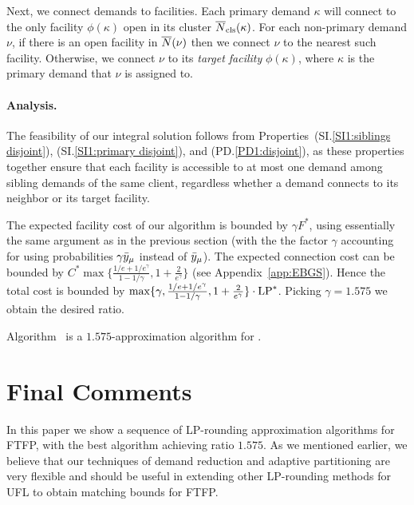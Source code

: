 \documentclass{llncs}
\begin{document}
Next, we connect demands to facilities.  Each primary demand $\kappa$
will connect to the only facility $\phi(\kappa)$ open in its cluster
${\overline{N}}_{\text{cls}}(\kappa)$.  For each non-primary demand $\nu$, if there is
an open facility in ${\overline{N}}(\nu)$ then we connect $\nu$ to the nearest
such facility. Otherwise, we connect $\nu$ to its \emph{target
  facility} $\phi(\kappa)$, where $\kappa$ is the primary demand that
$\nu$ is assigned to.


\paragraph{Analysis.}
The feasibility of our integral solution follows from
Properties~(SI.\ref{SI1:siblings disjoint}), (SI.\ref{SI1:primary
  disjoint}), and (PD.\ref{PD1:disjoint}), as these properties together
ensure that each facility is accessible to at most one demand among
sibling demands of the same client, regardless whether a demand
connects to its neighbor or its target facility.

The expected facility cost of our algorithm is bounded by $\gamma
F^\ast$, using essentially the same argument as in the previous
section (with the the factor $\gamma$ accounting for using
probabilities $\gamma {\bar y}_{\mu}$ instead of ${\bar y}_{\mu}$). The
expected connection cost can be bounded by $C^\ast
\max\{\frac{1/e+1/e^\gamma}{1-1/\gamma}, 1+\frac{2}{e^\gamma}\}$ (see
Appendix~\ref{app:EBGS}).  Hence the total cost is bounded by
$\max\{\gamma, \frac{1/e+1/e^\gamma}{1-1/\gamma},
1+\frac{2}{e^\gamma}\}\cdot \mbox{\rm LP}^\ast$. Picking $\gamma=1.575$ we
obtain the desired ratio.

\begin{theorem}\label{thm:ebgs}
  Algorithm~{\EBGS} is a $1.575$-approximation algorithm for \FTFP.
\end{theorem}



\section{Final Comments}

In this paper we show a sequence of LP-rounding approximation algorithms
for FTFP, with the best algorithm achieving  ratio $1.575$. 
As we mentioned earlier, we believe that 
our techniques of demand reduction and adaptive partitioning are very flexible and
should be useful in extending other LP-rounding methods for UFL to obtain
matching bounds for FTFP.
\end{document}
